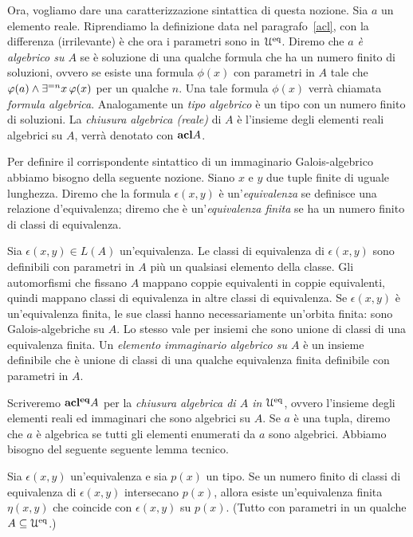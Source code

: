 Ora, vogliamo dare una caratterizzazione sintattica di questa nozione. Sia $a$ un elemento reale. Riprendiamo la definizione data nel paragrafo~\ref{acl}, con la differenza (irrilevante) \`e che ora i parametri sono in $\EuScript U^{\rm eq}$. Diremo che \emph{$a$ \`e algebrico su $A$\/} se \`e soluzione di una qualche formula che ha un numero finito di soluzioni, ovvero se  esiste una formula $\phi(x)$ con parametri in $A$ tale che $\varphi(a)\wedge\exists^{=n}x\,\varphi(x)$ per un qualche $n$. Una tale formula $\phi(x)$  verr\`a chiamata \emph{formula algebrica}. Analogamente un \emph{tipo algebrico\/} \`e un tipo con un numero finito di soluzioni. La \emph{chiusura algebrica (reale)\/} di $A$ \`e l'insieme degli elementi reali algebrici su $A$, verr\`a denotato con \emph{${\rm\bf acl} A$}.

Per definire il corrispondente sintattico di un immaginario Galois-algebrico abbiamo bisogno della seguente nozione. Siano $x$ e $y$ due tuple finite di uguale lunghezza. Diremo che la formula $\epsilon(x,y)$ \`e un'\emph{equivalenza\/} se definisce una relazione d'equivalenza; diremo che \`e un'\emph{equivalenza finita\/} se  ha un numero finito di classi di equivalenza.

Sia $\epsilon(x,y)\in L(A)$ un'equivalenza. Le classi di equivalenza di $\epsilon(x,y)$ sono definibili con parametri in $A$ pi\`u un qualsiasi elemento della classe. Gli automorfismi che fissano $A$ mappano coppie equivalenti in coppie equivalenti, quindi mappano classi di equivalenza in altre classi di equivalenza. Se $\epsilon(x,y)$ \`e un'equivalenza finita, le sue classi hanno necessariamente un'orbita finita: sono Galois-algebriche su $A$. Lo stesso vale per insiemi che sono unione di classi di una equivalenza finita. Un \emph{elemento immaginario algebrico su $A$\/} \`e un insieme definibile che \`e unione di classi di una qualche equivalenza finita definibile con parametri in $A$. 

Scriveremo \emph{${\rm\bf acl^{eq}} A$} per la \emph{chiusura algebrica di $A$ in $\EuScript U^{\rm eq}$}, ovvero l'insieme degli elementi reali ed immaginari che sono algebrici su $A$. Se $a$ \`e una tupla, diremo che $a$ \`e algebrica se tutti gli elementi enumerati da $a$ sono algebrici.
Abbiamo bisogno del seguente seguente lemma tecnico.

\begin{lemma}\label{lemmapartizionetipo} Sia $\epsilon(x,y)$ un'equivalenza e sia $p(x)$ un tipo. Se un numero finito di classi di equivalenza di $\epsilon(x,y)$ intersecano $p(x)$, allora esiste un'equivalenza finita $\eta(x,y)$ che coincide con $\epsilon(x,y)$ su $p(x)$. (Tutto con parametri in un qualche $A\subseteq\EuScript U^{\rm eq}$.)
\end{lemma}

